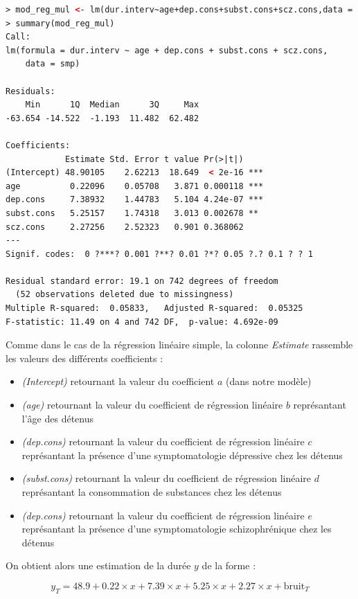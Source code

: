 \begin{lstlisting}[language=html]
> mod_reg_mul <- lm(dur.interv~age+dep.cons+subst.cons+scz.cons,data = smp)
> summary(mod_reg_mul)
Call:
lm(formula = dur.interv ~ age + dep.cons + subst.cons + scz.cons, 
    data = smp)

Residuals:
    Min      1Q  Median      3Q     Max 
-63.654 -14.522  -1.193  11.482  62.482 

Coefficients:
            Estimate Std. Error t value Pr(>|t|)    
(Intercept) 48.90105    2.62213  18.649  < 2e-16 ***
age          0.22096    0.05708   3.871 0.000118 ***
dep.cons     7.38932    1.44783   5.104 4.24e-07 ***
subst.cons   5.25157    1.74318   3.013 0.002678 ** 
scz.cons     2.27256    2.52323   0.901 0.368062    
---
Signif. codes:  0 ?***? 0.001 ?**? 0.01 ?*? 0.05 ?.? 0.1 ? ? 1

Residual standard error: 19.1 on 742 degrees of freedom
  (52 observations deleted due to missingness)
Multiple R-squared:  0.05833,	Adjusted R-squared:  0.05325 
F-statistic: 11.49 on 4 and 742 DF,  p-value: 4.692e-09
\end{lstlisting}

Comme dans le cas de la régression linéaire simple, la colonne \textit{Estimate} rassemble les valeurs des différents coefficients : 
\begin{itemize}
\item \textit{(Intercept)} retournant la valeur du coefficient $a$ (dans notre modèle)
\item \textit{(age)} retournant la valeur du coefficient de régression linéaire $b$ représantant l'âge des détenus 
\item \textit{(dep.cons)} retournant la valeur du coefficient de régression linéaire $c$ représantant la présence d'une symptomatologie dépressive chez les détenus 
\item \textit{(subst.cons)} retournant la valeur du coefficient de régression linéaire $d$ représantant la consommation de substances chez les détenus
\item \textit{(dep.cons)} retournant la valeur du coefficient de régression linéaire $e$ représantant la présence d'une symptomatologie schizophrénique chez les détenus 
\end{itemize}

On obtient alors une estimation de la durée $y$ de la forme : 

$$ y_{T} = 48.9 + 0.22\times x + 7.39\times x + 5.25\times x + 2.27\times x + \textrm{bruit}_{T} $$ 

